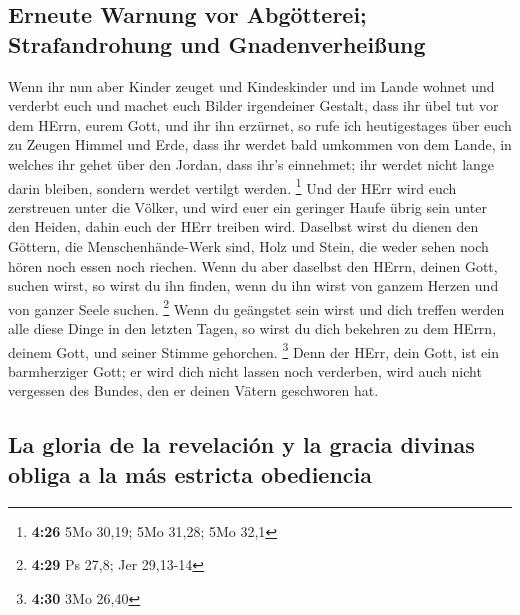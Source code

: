 \hypertarget{erneute-warnung-vor-abguxf6tterei-strafandrohung-und-gnadenverheiuxdfung}{%
\subsection{Erneute Warnung vor Abgötterei; Strafandrohung und
Gnadenverheißung}\label{erneute-warnung-vor-abguxf6tterei-strafandrohung-und-gnadenverheiuxdfung}}

 Wenn ihr nun aber Kinder zeuget und Kindeskinder und im
Lande wohnet und verderbt euch und machet euch Bilder irgendeiner
Gestalt, dass ihr übel tut vor dem HErrn, eurem Gott, und ihr ihn
erzürnet,  so rufe ich heutigestages über euch zu Zeugen
Himmel und Erde, dass ihr werdet bald umkommen von dem Lande, in welches
ihr gehet über den Jordan, dass ihr's einnehmet; ihr werdet nicht lange
darin bleiben, sondern werdet vertilgt werden. \footnote{\textbf{4:26}
  5Mo 30,19; 5Mo 31,28; 5Mo 32,1}  Und der HErr wird euch
zerstreuen unter die Völker, und wird euer ein geringer Haufe übrig sein
unter den Heiden, dahin euch der HErr treiben wird. 
Daselbst wirst du dienen den Göttern, die Menschenhände-Werk sind, Holz
und Stein, die weder sehen noch hören noch essen noch riechen.
 Wenn du aber daselbst den HErrn, deinen Gott, suchen
wirst, so wirst du ihn finden, wenn du ihn wirst von ganzem Herzen und
von ganzer Seele suchen. \footnote{\textbf{4:29} Ps 27,8; Jer 29,13-14}
 Wenn du geängstet sein wirst und dich treffen werden
alle diese Dinge in den letzten Tagen, so wirst du dich bekehren zu dem
HErrn, deinem Gott, und seiner Stimme gehorchen. \footnote{\textbf{4:30}
  3Mo 26,40}  Denn der HErr, dein Gott, ist ein
barmherziger Gott; er wird dich nicht lassen noch verderben, wird auch
nicht vergessen des Bundes, den er deinen Vätern geschworen hat.

\hypertarget{la-gloria-de-la-revelaciuxf3n-y-la-gracia-divinas-obliga-a-la-muxe1s-estricta-obediencia}{%
\subsection{La gloria de la revelación y la gracia divinas obliga a la
más estricta
obediencia}\label{la-gloria-de-la-revelaciuxf3n-y-la-gracia-divinas-obliga-a-la-muxe1s-estricta-obediencia}}

